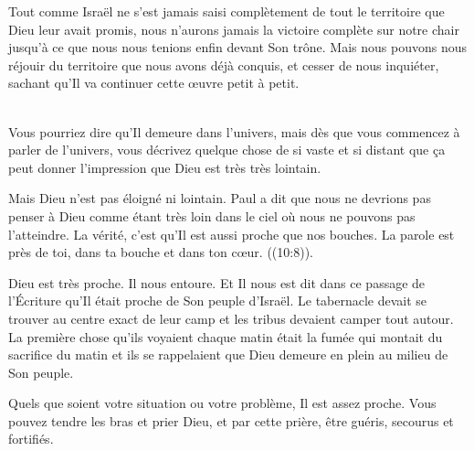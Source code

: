 Tout comme Israël ne s'est jamais saisi complètement
 de tout le territoire que Dieu leur avait promis,
 nous n'aurons jamais la victoire complète sur notre chair
 jusqu'à ce que nous nous tenions enfin devant Son trône.
 Mais nous pouvons nous réjouir du territoire que nous avons déjà conquis,
 et cesser de nous inquiéter, sachant qu'Il va continuer cette œuvre
 \ocadr{}petit à petit. 

\dvrule






 \\[1ex]
Vous pourriez dire qu'Il demeure dans l'univers,
 mais dès que vous commencez à parler de l'univers,
 vous décrivez quelque chose de si vaste et si distant
 que ça peut donner l'impression que Dieu est très très lointain.

Mais Dieu n'est pas éloigné ni lointain.
 Paul a dit que nous ne devrions pas penser à Dieu comme étant très loin
 dans le ciel où nous ne pouvons pas l'atteindre.
 La vérité, c'est qu'Il est aussi proche que nos bouches.
 \og La parole est près de toi, dans ta bouche et dans ton cœur. \fg{}
 ((10:8)).

Dieu est très proche. Il nous entoure.
 Et Il nous est dit dans ce passage de l'Écriture
 qu'Il était proche de Son peuple d'Israël.
 Le tabernacle devait se trouver au centre exact de leur camp
 et les tribus devaient camper tout autour.
 La première chose qu'ils voyaient chaque matin était la fumée
 qui montait du sacrifice du matin
 \ocadr{}et ils se rappelaient que Dieu demeure en plein au milieu de Son peuple.


Quels que soient votre situation ou votre problème, Il est assez proche.
 Vous pouvez tendre les bras et prier Dieu, et par cette prière,
 être guéris, secourus et fortifiés. 


